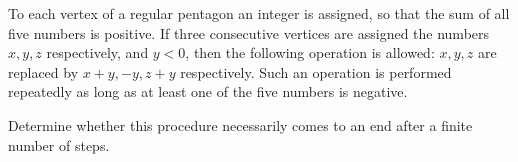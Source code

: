 To each vertex of a regular 
pentagon an integer is assigned, so that the sum of all five numbers is 
positive. If three consecutive vertices are assigned the numbers $x,y,z$ respectively, and $y<0$,  then the following operation is allowed: $x,y,z$ are replaced by $x+y,-y,z+y$
 respectively. Such an operation is performed repeatedly as long as at 
least one of the five numbers is negative.

Determine whether this 
procedure necessarily comes to an end after a finite number of steps.
